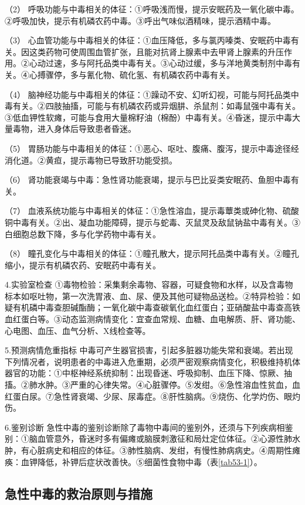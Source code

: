 （2）
呼吸功能与中毒相关的体征：①呼吸浅而慢，提示安眠药及一氧化碳中毒。②呼吸加快，提示有机磷农药中毒。③呼出气味似酒精味，提示酒精中毒。

（3）
心血管功能与中毒相关的体征：①血压降低，多与氯丙嗪类、安眠药中毒有关。因这类药物可使周围血管扩张，且能对抗肾上腺素中去甲肾上腺素的升压作用。②心动过速，多与阿托品类中毒有关。③心动过缓，多与洋地黄类制剂中毒有关。④心搏骤停，多与氰化物、硫化氢、有机磷农药中毒有关。

（4）
脑神经功能与中毒相关的体征：①躁动不安、幻听幻视，可能与阿托品类中毒有关。②四肢抽搐，可能与有机磷农药或异烟肼、杀鼠剂：如毒鼠强中毒有关。③低血钾性软瘫，可能与食用大量棉籽油（棉酚）中毒有关。④昏迷，提示中毒大量毒物，进入身体后导致患者昏迷。

（5）
胃肠功能与中毒相关的体征：①恶心、呕吐、腹痛、腹泻，提示中毒途径经消化道。②黄疸，提示毒物已导致肝功能受损。

（6）
肾功能衰竭与中毒：急性肾功能衰竭，提示与巴比妥类安眠药、鱼胆中毒有关。

（7）
血液系统功能与中毒相关的体征：①急性溶血，提示毒蕈类或砷化物、硫酸铜中毒有关。②出、凝血功能障碍，提示与蛇毒、灭鼠灵及敌鼠钠盐中毒有关。③白细胞总数下降，多与化学药物中毒有关。

（8）
瞳孔变化与中毒相关的体征：①瞳孔散大，提示阿托品类中毒有关。②瞳孔缩小，提示有机磷农药、安眠药中毒有关。

4.实验室检查
①毒物检验：采集剩余毒物、容器，可疑食物和水样，以及含毒物标本如呕吐物，第一次洗胃液、血、尿、便及其他可疑物品送检。②特异检验：如疑有机磷中毒查胆碱酯酶；一氧化碳中毒查碳氧化血红蛋白；亚硝酸盐中毒查高铁血红蛋白等。③动态监测病情变化：宜查血常规、血糖、血电解质、肝、肾功能、心电图、血压、血气分析、X线检查等。

5.预测病情危重指标
中毒可产生器官损害，引起多脏器功能失常和衰竭。若出现下列情况者，说明患者的中毒进入危重期，必须严密观察病情变化，积极维持机体器官的功能：①中枢神经系统抑制：出现昏迷、呼吸抑制、血压下降、惊厥、抽搐。②肺水肿。③严重的心律失常。④心脏骤停。⑤发绀。⑥急性溶血性贫血，血红蛋白尿。⑦急性肾衰竭、少尿、尿毒症。⑧肝性脑病。⑨烧伤、化学灼伤、眼灼伤。

6.鉴别诊断
急性中毒的鉴别诊断除了毒物中毒间的鉴别外，还须与下列疾病相鉴别：①脑血管意外，昏迷时多有偏瘫或脑膜刺激征和局灶定位体征。②心源性肺水肿，有心脏病史和相应的体征。③肺性脑病、发绀，有慢性肺病病史。④周期性瘫痪：血钾降低，补钾后症状改善快。⑤细菌性食物中毒（表\ref{tab53-1}）。

\subsection{急性中毒的救治原则与措施}

